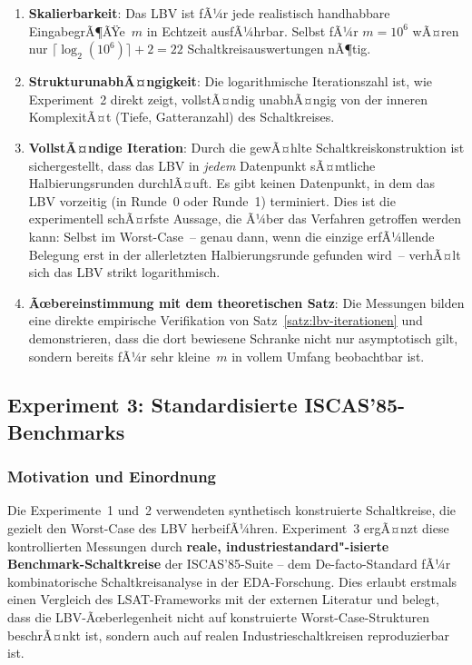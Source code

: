 ﻿\documentclass[a4paper,12pt]{article}
\theoremstyle{definition}
\begin{document}
\begin{enumerate}
  \item \textbf{Skalierbarkeit}: Das LBV ist fÃ¼r jede realistisch handhabbare EingabegrÃ¶ÃŸe~$m$
    in Echtzeit ausfÃ¼hrbar.  Selbst fÃ¼r $m = 10^6$ wÃ¤ren nur $\lceil\log_2(10^6)\rceil + 2 = 22$
    Schaltkreisauswertungen nÃ¶tig.

  \item \textbf{StrukturunabhÃ¤ngigkeit}: Die logarithmische Iterationszahl ist, wie
    Experiment~2 direkt zeigt, vollstÃ¤ndig unabhÃ¤ngig von der inneren KomplexitÃ¤t
    (Tiefe, Gatteranzahl) des Schaltkreises.

  \item \textbf{VollstÃ¤ndige Iteration}: Durch die gewÃ¤hlte Schaltkreiskonstruktion
    ist sichergestellt, dass das LBV in \emph{jedem} Datenpunkt sÃ¤mtliche Halbierungsrunden
    durchlÃ¤uft.  Es gibt keinen Datenpunkt, in dem das LBV vorzeitig (in Runde~0 oder
    Runde~1) terminiert.  Dies ist die experimentell schÃ¤rfste Aussage, die Ã¼ber das
    Verfahren getroffen werden kann: Selbst im Worst-Case~-- genau dann, wenn die
    einzige erfÃ¼llende Belegung erst in der allerletzten Halbieru\-ngsrunde
    gefunden wird~-- verhÃ¤lt sich das LBV strikt logarithmisch.

  \item \textbf{Ãœbereinstimmung mit dem theoretischen Satz}: Die Messungen bilden eine
    direkte empirische Verifikation von Satz~\ref{satz:lbv-iterationen} und demonstrieren,
    dass die dort bewiesene Schranke nicht nur asymptotisch gilt, sondern bereits fÃ¼r
    sehr kleine~$m$ in vollem Umfang beobachtbar ist.
\end{enumerate}

\subsection{Experiment 3: Standardisierte ISCAS'85-Benchmarks}
\label{subsec:exp3}

\subsubsection{Motivation und Einordnung}

Die Experimente~1 und~2 verwendeten synthetisch konstruierte Schaltkreise,
die gezielt den Worst-Case des LBV herbeifÃ¼hren.  Experiment~3 ergÃ¤nzt
diese kontrollierten Messungen durch \textbf{reale, industriestandard"-isierte
Benchmark-Schaltkreise} der ISCAS'85-Suite \cite{Brglez85} -- dem
De-facto-Standard fÃ¼r kombinatorische Schaltkreisanalyse in der
EDA-Forschung.  Dies erlaubt erstmals einen Vergleich des LSAT-Frameworks
mit der externen Literatur und belegt, dass die LBV-Ãœberlegenheit nicht auf
konstruierte Worst-Case-Strukturen beschrÃ¤nkt ist, sondern auch auf
realen Industrieschaltkreisen reproduzierbar ist.
\end{document}
